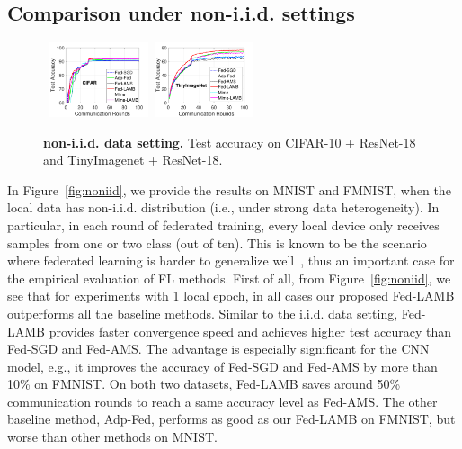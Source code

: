 \documentclass[nohyperref]{article}
\theoremstyle{plain}
\theoremstyle{definition}
\theoremstyle{remark}
\begin{document}
\subsection{Comparison under non-i.i.d. settings}




\begin{figure}[h]
\vspace{-0.15in}
    \begin{center}
        \mbox{\hspace{-0.1in}
        \includegraphics[width=0.26\textwidth]{figure_mime/cifar_testerror_resnet18_ep1_client2_iid0_mime.pdf}
        \hspace{-0.15in}
        \includegraphics[width=0.26\textwidth]{figure_mime/tinyimagenet_testerror_resnet18_ep1_client2_iid0_mime.pdf}\hspace{-0.1in}
        }
    \end{center}\vspace{0.1in}
	\caption{\textbf{non-i.i.d. data setting.} Test accuracy on CIFAR-10 + ResNet-18 and TinyImagenet + ResNet-18.
	}
	\label{fig:noniidresnet18}\vspace{-0.1in}
\end{figure}


In Figure~\ref{fig:noniid}, we provide the results on  MNIST and FMNIST, when the local data has non-i.i.d. distribution (i.e., under strong data heterogeneity). In particular, in each round of federated training, every local device only receives samples from one or two class (out of ten). This is known to be the scenario where federated learning is harder to generalize well~\citep{mcmahan2017communication}, thus an important case for the empirical evaluation of FL methods. 
First of all, from Figure~\ref{fig:noniid}, we see that for experiments with 1 local epoch, in all cases our proposed Fed-LAMB outperforms all the baseline methods. Similar to the i.i.d. data setting, Fed-LAMB provides faster convergence speed and achieves higher test accuracy than Fed-SGD and Fed-AMS. The advantage is especially significant for the CNN model, e.g., it improves the accuracy of Fed-SGD and Fed-AMS by more than 10\% on FMNIST. On both two datasets, Fed-LAMB saves around 50\% communication rounds to reach a same accuracy level as Fed-AMS. The other baseline method, Adp-Fed, performs as good as our Fed-LAMB on FMNIST, but worse than other methods on MNIST.
\end{document}
